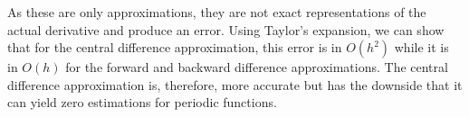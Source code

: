 As these are only approximations, they are not exact representations of the actual derivative and produce an error. Using Taylor's expansion, we can show that for the central difference approximation, this error is in $O(h^2)$ while it is in $O(h)$ for the forward and backward difference approximations. The central difference approximation is, therefore, more accurate but has the downside that it can yield zero estimations for periodic functions.

